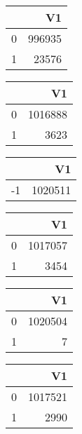 \bigskip\bigskip
\centering
\begin{tabular}{rr}
  \hline
 & V1 \\ 
  \hline
0 & 996935 \\ 
  1 & 23576 \\ 
   \hline
\end{tabular}

\bigskip\bigskip
\centering
\begin{tabular}{rr}
  \hline
 & V1 \\ 
  \hline
0 & 1016888 \\ 
  1 & 3623 \\ 
   \hline
\end{tabular}

\bigskip\bigskip
\centering
\begin{tabular}{rr}
  \hline
 & V1 \\ 
  \hline
-1 & 1020511 \\ 
   \hline
\end{tabular}

\bigskip\bigskip
\centering
\begin{tabular}{rr}
  \hline
 & V1 \\ 
  \hline
0 & 1017057 \\ 
  1 & 3454 \\ 
   \hline
\end{tabular}

\bigskip\bigskip
\centering
\begin{tabular}{rr}
  \hline
 & V1 \\ 
  \hline
0 & 1020504 \\ 
  1 &   7 \\ 
   \hline
\end{tabular}

\bigskip\bigskip
\centering
\begin{tabular}{rr}
  \hline
 & V1 \\ 
  \hline
0 & 1017521 \\ 
  1 & 2990 \\ 
   \hline
\end{tabular}

